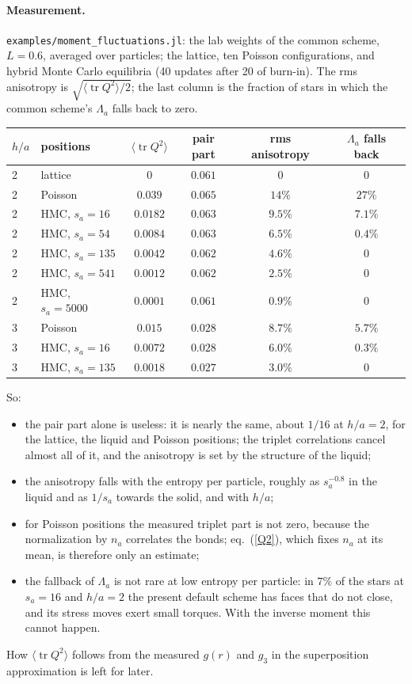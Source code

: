 \documentclass[11pt,aps,preprint,nofootinbib,superscriptaddress,tightenlines]{revtex4-2}
\def\Eq#1{eq.~(\ref{#1})}
\def\tr{\operatorname{tr}}
\let\oldparagraph\paragraph
\renewcommand{\paragraph}{\par\bigskip\oldparagraph}
\begin{document}
\paragraph{Measurement.}  \texttt{examples/moment\_fluctuations.jl}: the lab weights of the common scheme, $L=0.6$, averaged over particles; the
lattice, ten Poisson configurations, and hybrid Monte Carlo equilibria (40 updates after 20 of burn-in).  The rms anisotropy is
$\sqrt{\langle\tr Q^2\rangle/2}$; the last column is the fraction of stars in which the common scheme's $\Lambda_a$ falls back to zero.
\begin{center}
\begin{tabular}{llcccc}
\hline
$h/a$ & positions & $\langle\tr Q^2\rangle$ & pair part & rms anisotropy & $\Lambda_a$ falls back \\ \hline
2 & lattice & $0$ & $0.061$ & $0$ & $0$ \\
2 & Poisson & $0.039$ & $0.065$ & $14\%$ & $27\%$ \\
2 & HMC, $s_a=16$ & $0.0182$ & $0.063$ & $9.5\%$ & $7.1\%$ \\
2 & HMC, $s_a=54$ & $0.0084$ & $0.063$ & $6.5\%$ & $0.4\%$ \\
2 & HMC, $s_a=135$ & $0.0042$ & $0.062$ & $4.6\%$ & $0$ \\
2 & HMC, $s_a=541$ & $0.0012$ & $0.062$ & $2.5\%$ & $0$ \\
2 & HMC, $s_a=5000$ & $0.0001$ & $0.061$ & $0.9\%$ & $0$ \\
3 & Poisson & $0.015$ & $0.028$ & $8.7\%$ & $5.7\%$ \\
3 & HMC, $s_a=16$ & $0.0072$ & $0.028$ & $6.0\%$ & $0.3\%$ \\
3 & HMC, $s_a=135$ & $0.0018$ & $0.027$ & $3.0\%$ & $0$ \\
\hline
\end{tabular}
\end{center}
So:
\begin{itemize}
\item the pair part alone is useless: it is nearly the same, about $1/16$ at $h/a=2$, for the lattice, the liquid and Poisson positions; the
  triplet correlations cancel almost all of it, and the anisotropy is set by the structure of the liquid;
\item the anisotropy falls with the entropy per particle, roughly as $s_a^{-0.8}$ in the liquid and as $1/s_a$ towards the solid, and with $h/a$;
\item for Poisson positions the measured triplet part is not zero, because the normalization by $n_a$ correlates the bonds; \Eq{Q2},
  which fixes $n_a$ at its mean, is therefore only an estimate;
\item the fallback of $\Lambda_a$ is not rare at low entropy per particle: in $7\%$ of the stars at $s_a=16$ and $h/a=2$ the present default scheme
  has faces that do not close, and its stress moves exert small torques.  With the inverse moment this cannot happen.
\end{itemize}
How $\langle\tr Q^2\rangle$ follows from the measured $g(r)$ and $g_3$ in the superposition approximation is left for later.
\end{document}
